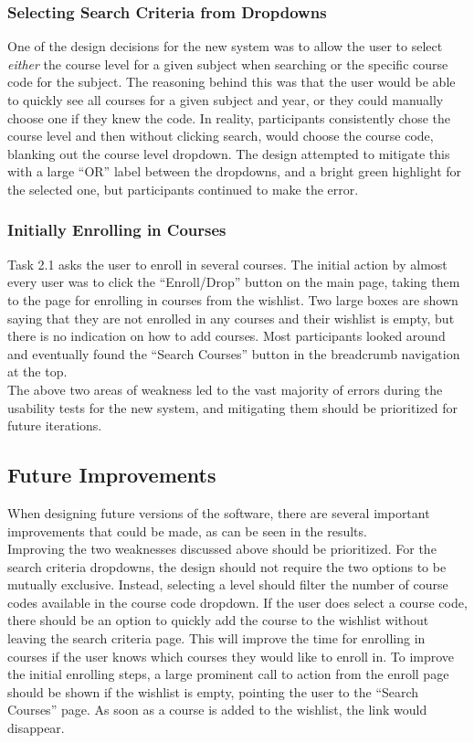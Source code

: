 \documentclass[10pt]{article}
\begin{document}
\begin{multicols}{2}
\subsubsection*{Selecting Search Criteria from Dropdowns}
One of the design decisions for the new system was to allow the user to select \emph{either} the course level for a given subject when searching or the specific course code for the subject. The reasoning behind this was that the user would be able to quickly see all courses for a given subject and year, or they could manually choose one if they knew the code. In reality, participants consistently chose the course level and then without clicking search, would choose the course code, blanking out the course level dropdown. The design attempted to mitigate this with a large ``OR'' label between the dropdowns, and a bright green highlight for the selected one, but participants continued to make the error.

\subsubsection*{Initially Enrolling in Courses}
Task 2.1 asks the user to enroll in several courses. The initial action by almost every user was to click the ``Enroll/Drop'' button on the main page, taking them to the page for enrolling in courses from the wishlist. Two large boxes are shown saying that they are not enrolled in any courses and their wishlist is empty, but there is no indication on how to add courses. Most participants looked around and eventually found the ``Search Courses'' button in the breadcrumb navigation at the top.\\

The above two areas of weakness led to the vast majority of errors during the usability tests for the new system, and mitigating them should be prioritized for future iterations.

\subsection*{Future Improvements}
When designing future versions of the software, there are several important improvements that could be made, as can be seen in the results.\\

Improving the two weaknesses discussed above should be prioritized. For the search criteria dropdowns, the design should not require the two options to be mutually exclusive. Instead, selecting a level should filter the number of course codes available in the course code dropdown. If the user does select a course code, there should be an option to quickly add the course to the wishlist without leaving the search criteria page. This will improve the time for enrolling in courses if the user knows which courses they would like to enroll in. To improve the initial enrolling steps, a large prominent call to action from the enroll page should be shown if the wishlist is empty, pointing the user to the ``Search Courses'' page. As soon as a course is added to the wishlist, the link would disappear.\\


\end{multicols}
\end{document}
